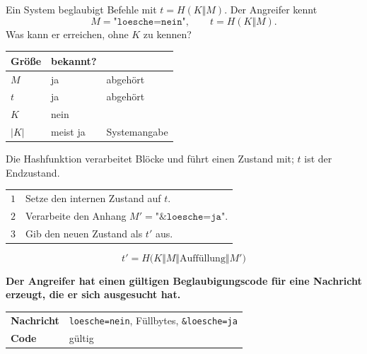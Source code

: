 \begin{aufgabe}
Ein System beglaubigt Befehle mit $t = H(K\Vert M)$. Der Angreifer kennt
\[ M = \texttt{"loesche=nein"}, \qquad t = H(K\Vert M) . \]
Was kann er erreichen, ohne $K$ zu kennen?

\loesung
{}
\begin{center}
{\small
\renewcommand{\arraystretch}{1.48}
\begin{tabular}{@{}P{2.4cm}P{2.6cm}P{2.6cm}@{}}
\toprule
\textbf{Größe} & \textbf{bekannt?} & \\
\midrule
$M$ & ja & abgehört\\
$t$ & ja & abgehört\\
$K$ & \textcolor{gruen}{nein} & \\
$|K|$ & meist ja & Systemangabe\\
\bottomrule
\end{tabular}}
\end{center}

Die Hashfunktion verarbeitet Blöcke und führt einen Zustand mit; $t$ ist der Endzustand.

\begin{center}
\renewcommand{\arraystretch}{1.5}
\begin{tabular}{@{}P{1.0cm}P{7.4cm}@{}}
\toprule
$1$ & Setze den internen Zustand auf $t$.\\
$2$ & Verarbeite den Anhang $M' = \texttt{"\&loesche=ja"}$.\\
$3$ & Gib den neuen Zustand als $t'$ aus.\\
\bottomrule
\end{tabular}
\end{center}

\[ t' = H\bigl(K \Vert M \Vert \text{Auffüllung} \Vert M'\bigr) \]

\begin{center}
\begin{minipage}{0.9\textwidth}
\textbf{Der Angreifer hat einen gültigen Beglaubigungscode für eine Nachricht erzeugt, die er sich ausgesucht hat.}
\end{minipage}
\end{center}

\begin{center}
{\small
\renewcommand{\arraystretch}{1.48}
\begin{tabular}{@{}P{2.8cm}P{5.4cm}@{}}
\toprule
\textbf{Nachricht} & \texttt{loesche=nein}, Füllbytes, \texttt{\&loesche=ja}\\
\textbf{Code} & gültig\\
\bottomrule
\end{tabular}}
\end{center}


\end{aufgabe}
